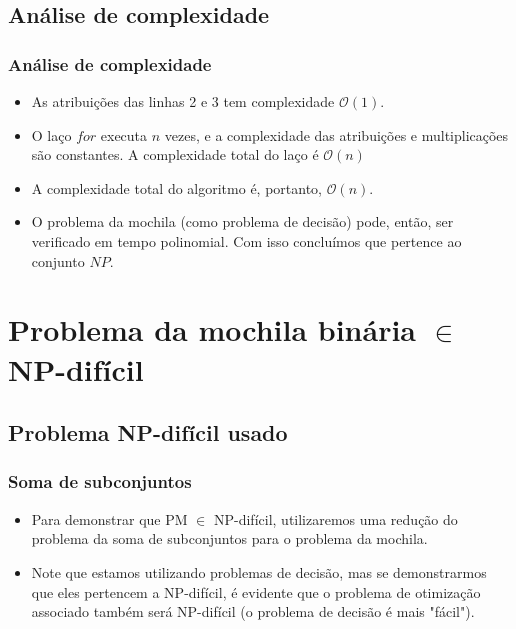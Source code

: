 \documentclass{beamer}
\begin{document}
\subsection{Análise de complexidade}
\begin{frame}
    \frametitle{Análise de complexidade}

    \begin{itemize}
        \item As atribuições das linhas 2 e 3 tem complexidade $\mathcal{O}(1)$.

        \item O laço $for$ executa $n$ vezes, e a complexidade das atribuições e multiplicações são constantes.
            A complexidade total do laço é $\mathcal{O}(n)$

        \item A complexidade total do algoritmo é, portanto, $\mathcal{O}(n)$.
        \item O problema da mochila (como problema de decisão) pode, então, ser verificado em tempo polinomial.
              Com isso concluímos que pertence ao conjunto $NP$.
    \end{itemize}

\end{frame}


\section{Problema da mochila binária $\in$ NP-difícil}

\subsection{Problema NP-difícil usado}
\begin{frame}
    \frametitle{Soma de subconjuntos}
    \begin{itemize}
        \item
            Para demonstrar que PM $\in$ NP-difícil, utilizaremos uma redução do problema
            da soma de subconjuntos para o problema da mochila.
        \item
            Note que estamos utilizando problemas de decisão, mas se demonstrarmos que
            eles pertencem a NP-difícil, é evidente que o problema de otimização associado
            também será NP-difícil (o problema de decisão é mais "fácil").
    \end{itemize}

\end{frame}
\end{document}
